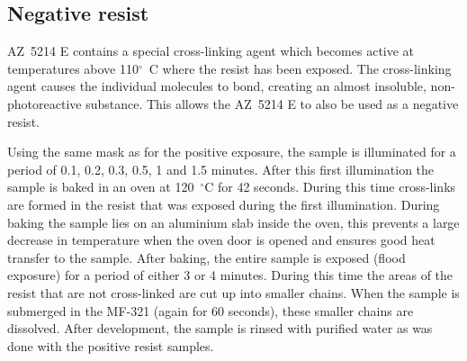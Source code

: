 \subsection*{Negative resist}
AZ~5214 E contains a special cross-linking agent which becomes active at temperatures above 110$^{\circ}$~C where the resist has been exposed. The cross-linking agent causes the individual molecules to bond, creating an almost insoluble, non-photoreactive substance. This allows the AZ~5214 E to also be used as a negative resist.

Using the same mask as for the positive exposure, the sample is illuminated for a period of 0.1, 0.2, 0.3, 0.5, 1 and 1.5 minutes. After this first illumination the sample is baked in an oven at 120~$^\circ$C for 42 seconds. During this time cross-links are formed in the resist that was exposed during the first illumination. During baking the sample lies on an aluminium slab inside the oven, this prevents a large decrease in temperature when the oven door is opened and ensures good heat transfer to the sample. After baking, the entire sample is exposed (flood exposure) for a period of either 3 or 4 minutes. During this time the areas of the resist that are not cross-linked are cut up into smaller chains. When the sample is submerged in the MF-321 (again for 60 seconds), these smaller chains are dissolved. After development, the sample is rinsed with purified water as was done with the positive resist samples\cite{productdatasheet}.


